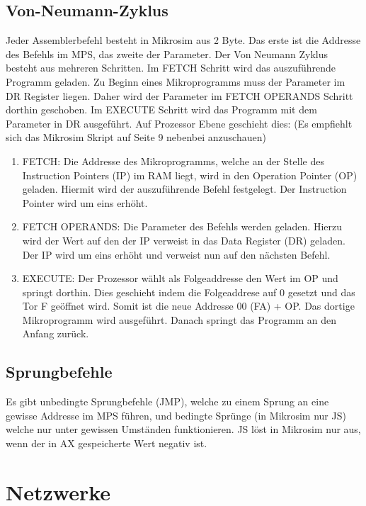 \documentclass{article}
\begin{document}
\subsection*{Von-Neumann-Zyklus}
Jeder Assemblerbefehl besteht in Mikrosim aus 2 Byte. Das erste ist die Addresse des Befehls im MPS, das zweite der Parameter.\newline
Der Von Neumann Zyklus besteht aus mehreren Schritten.\newline
Im FETCH Schritt wird das auszuführende Programm geladen.\newline
Zu Beginn eines Mikroprogramms muss der Parameter im DR Register liegen. Daher wird der Parameter im FETCH OPERANDS Schritt dorthin geschoben.\newline
Im EXECUTE Schritt wird das Programm mit dem Parameter in DR ausgeführt.\newline
Auf Prozessor Ebene geschieht dies: (Es empfiehlt sich das Mikrosim Skript auf Seite 9 nebenbei anzuschauen)
\begin{enumerate}
    \item FETCH: Die Addresse des Mikroprogramms, welche an der Stelle des Instruction Pointers (IP) im RAM liegt, wird in den Operation Pointer
    (OP) geladen. Hiermit wird der auszuführende Befehl festgelegt. Der Instruction Pointer wird um eins erhöht.
    \item FETCH OPERANDS: Die Parameter des Befehls werden geladen. Hierzu wird der Wert auf den der IP verweist in das Data Register (DR)
    geladen. Der IP wird um eins erhöht und verweist nun auf den nächsten Befehl.
    \item EXECUTE: Der Prozessor wählt als Folgeaddresse den Wert im OP und springt dorthin. Dies geschieht indem die Folgeaddrese auf 
    0 gesetzt und das Tor F geöffnet wird. Somit ist die neue Addresse 00 (FA) + OP. Das dortige Mikroprogramm wird ausgeführt.
    Danach springt das Programm an den Anfang zurück.
\end{enumerate}

\subsection*{Sprungbefehle}
Es gibt unbedingte Sprungbefehle (JMP), welche zu einem Sprung an eine gewisse Addresse im MPS führen, und bedingte Sprünge
(in Mikrosim nur JS) welche nur unter gewissen Umständen funktionieren. JS löst in Mikrosim nur aus, wenn der in AX gespeicherte
Wert negativ ist.

\section*{Netzwerke}
\end{document}
